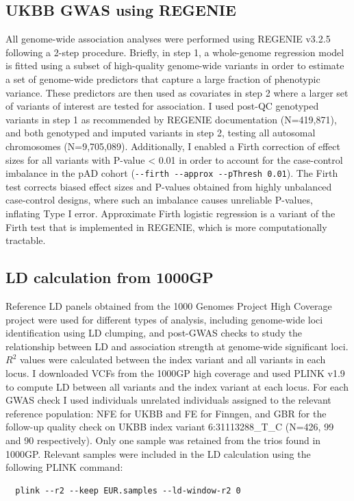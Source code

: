 \subsection{UKBB GWAS using REGENIE}
All genome-wide association analyses were performed using REGENIE v3.2.5 \cite{Mbatchou2021-qm} following a 2-step procedure. Briefly, in step 1, a whole-genome regression model is fitted using a subset of high-quality genome-wide variants in order to estimate a set of genome-wide predictors that capture a large fraction of phenotypic variance. These predictors are then used as covariates in step 2 where a larger set of variants of interest are tested for association.
I used post-QC genotyped variants in step 1 as recommended by REGENIE documentation (N=419,871), and both genotyped and imputed variants in step 2, testing all autosomal chromosomes (N=9,705,089). Additionally, I enabled a Firth correction of effect sizes for all variants with P-value < 0.01 in order to account for the case-control imbalance in the pAD cohort (\Verb+--firth --approx --pThresh 0.01+). The Firth test corrects biased effect sizes and P-values obtained from highly unbalanced case-control designs, where such an imbalance causes unreliable P-values, inflating Type I error. Approximate Firth logistic regression is a variant of the Firth test that is implemented in REGENIE, which is more computationally tractable. 

\subsection{LD calculation from 1000GP}
Reference LD panels obtained from the 1000 Genomes Project High Coverage project were used for different types of analysis, including genome-wide loci identification using LD clumping, and post-GWAS checks to study the relationship between LD and association strength at genome-wide significant loci. $R^{2}$ values were calculated between the index variant and all variants in each locus. I downloaded VCFs from the 1000GP high coverage and used PLINK v1.9 to compute LD between all variants and the index variant at each locus. For each GWAS check I used individuals unrelated individuals assigned to the relevant reference population: NFE for UKBB and FE for Finngen, and GBR for the follow-up quality check on UKBB index variant 6:31113288\_T\_C (N=426, 99 and 90 respectively). Only one sample was retained from the trios found in 1000GP. Relevant samples were included in the LD calculation using the following PLINK command:
\begin{verbatim}
  plink --r2 --keep EUR.samples --ld-window-r2 0 
\end{verbatim}

